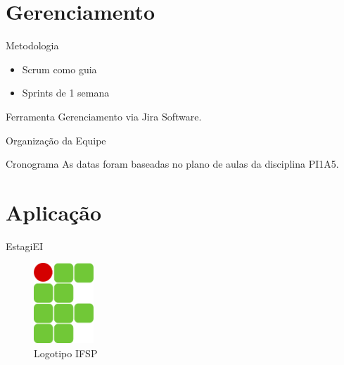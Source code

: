 \documentclass[%
    english,
    brazil]{ifsp-spo-beamer}
\begin{document}
\section{Gerenciamento}

\begin{frame}{Metodologia} 
\begin{itemize}
  \item Scrum como guia
  \item Sprints de 1 semana
\end{itemize}
\end{frame}

\begin{frame}{Ferramenta} 
Gerenciamento via Jira Software.
\end{frame}

\begin{frame}{Organização da Equipe} 
\end{frame}

\begin{frame}{Cronograma} 
As datas foram baseadas no plano de aulas da disciplina PI1A5.
\end{frame}

\section{Aplicação}

\begin{frame}{EstagiEI}

    \begin{figure}
        \centering
    	\caption{\label{fig_logo}Logotipo IFSP}
    	\includegraphics[width=0.2\textwidth]{if-logo-beamer.png}
    \end{figure}

\end{frame}
\end{document}
